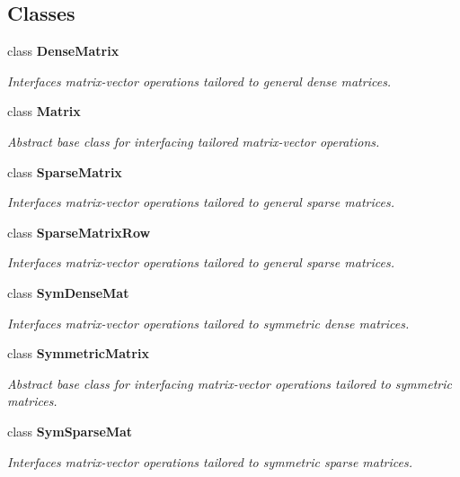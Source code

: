 \subsection*{Classes}
\begin{DoxyCompactItemize}
\item 
class {\bf DenseMatrix}
\begin{DoxyCompactList}\small\item\em Interfaces matrix-\/vector operations tailored to general dense matrices. \end{DoxyCompactList}\item 
class {\bf Matrix}
\begin{DoxyCompactList}\small\item\em Abstract base class for interfacing tailored matrix-\/vector operations. \end{DoxyCompactList}\item 
class {\bf SparseMatrix}
\begin{DoxyCompactList}\small\item\em Interfaces matrix-\/vector operations tailored to general sparse matrices. \end{DoxyCompactList}\item 
class {\bf SparseMatrixRow}
\begin{DoxyCompactList}\small\item\em Interfaces matrix-\/vector operations tailored to general sparse matrices. \end{DoxyCompactList}\item 
class {\bf SymDenseMat}
\begin{DoxyCompactList}\small\item\em Interfaces matrix-\/vector operations tailored to symmetric dense matrices. \end{DoxyCompactList}\item 
class {\bf SymmetricMatrix}
\begin{DoxyCompactList}\small\item\em Abstract base class for interfacing matrix-\/vector operations tailored to symmetric matrices. \end{DoxyCompactList}\item 
class {\bf SymSparseMat}
\begin{DoxyCompactList}\small\item\em Interfaces matrix-\/vector operations tailored to symmetric sparse matrices. \end{DoxyCompactList}\end{DoxyCompactItemize}
